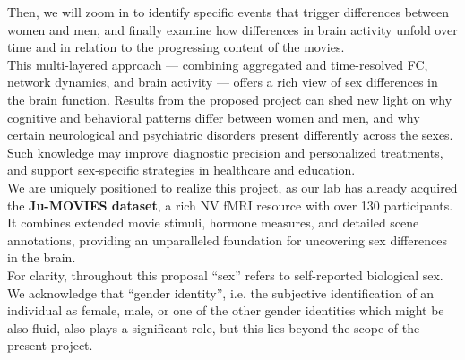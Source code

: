 \documentclass[11pt,a4paper]{article}
\begin{document}
Then, we will zoom in to
identify specific events that trigger differences between women and men, and finally examine how differences in brain activity
unfold over time and in relation to the progressing content of the movies.\\
This multi-layered approach — combining aggregated and time-resolved FC, network dynamics, and brain activity — offers 
a rich view of sex differences in the brain function. 
Results from the proposed project can shed new light on why cognitive and behavioral patterns differ 
between women and men, and why certain neurological and psychiatric disorders present differently across the sexes. 
Such knowledge may improve diagnostic precision and personalized treatments, and support sex-specific 
strategies in healthcare and education.\\
We are uniquely positioned to realize this project, as our lab has already acquired the \textbf{Ju-MOVIES dataset}, 
a rich NV fMRI resource with over 130 participants. It combines extended movie stimuli, 
hormone measures, and detailed scene annotations, providing an unparalleled foundation for 
uncovering sex differences in the brain.\\
For clarity, throughout this proposal “sex” refers to self-reported biological sex. 
We acknowledge that “gender identity”, i.e. the 
subjective identification of an individual as female, male, or one of the other gender identities which might 
be also fluid, also plays a significant role, but this lies 
beyond the scope of the present project.
\end{document}
